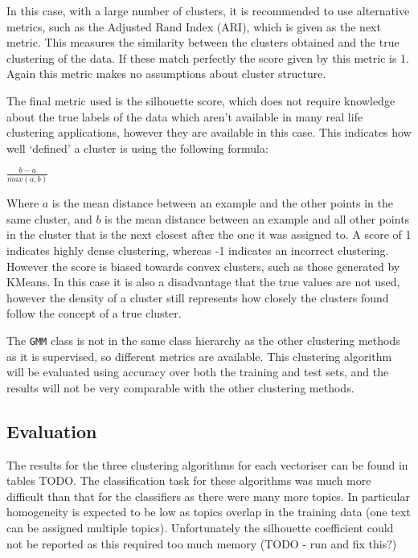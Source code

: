 \documentclass{article}
\begin{document}
In this case, with a large number of clusters, it is recommended to use alternative metrics, such as the Adjusted Rand Index (ARI), which is given as the next metric. This measures the similarity between the clusters obtained and the true clustering of the data. If these match perfectly the score given by this metric is 1. Again this metric makes no assumptions about cluster structure.

The final metric used is the silhouette score, which does not require knowledge about the true labels of the data which aren't available in many real life clustering applications, however they are available in this case.  This indicates how well `defined' a cluster is using the following formula:

\begin{center}
$\frac{b-a}{max(a,b)}$
\end{center}

Where $a$ is the mean distance between an example and the other points in the same cluster, and $b$ is the mean distance between an example and all other points in the cluster that is the next closest after the one it was assigned to. A score of 1 indicates highly dense clustering, whereas -1 indicates an incorrect clustering. However the score is biased towards convex clusters, such as those generated by KMeans. In this case it is also a disadvantage that the true values are not used, however the density of a cluster still represents how closely the clusters found follow the concept of a true cluster.

The \verb|GMM| class is not in the same class hierarchy as the other clustering methods as it is supervised, so different metrics are available. This clustering algorithm will be evaluated using accuracy over both the training and test sets, and the results will not be very comparable with the other clustering methods.  

\subsection{Evaluation}
The results for the three clustering algorithms for each vectoriser can be found in tables TODO. The classification task for these algorithms was much more difficult than that for the classifiers as there were many more topics. In particular homogeneity is expected to be low as topics overlap in the training data (one text can be assigned multiple topics). Unfortunately the silhouette coefficient could not be reported as this required too much memory (TODO - run and fix this?)
\end{document}
